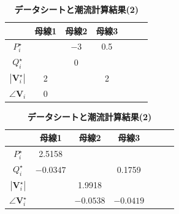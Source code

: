 \documentclass[tombow,dvipdfmx]{corona-a5-1.1}
\begin{document}
\begin{table}[h]
\medskip
\caption{\textbf{データシートと潮流計算結果(2)}} \label{table:pflow2}
 \centering
  {
  \begin{minipage}{0.49\linewidth}
    \centering
  \begin{tabular}{|c|c|c|c|c|c|c|}
   \hline
 & 母線1 & 母線2 & 母線3 \\
   \hline 
   $P_i^{\star}$ &  & $-3$ & 0.5 \\
   \hline    
   $Q_i^{\star}$ &  & 0 & \\
   \hline
   $|\bm{V}_i^{\star}|$ & 2 & & 2 \\
   \hline
   $\angle \bm{V}_i$ & 0 & &  \\
   \hline
  \end{tabular}
  \end{minipage}
  \begin{minipage}{0.49\linewidth}
    \centering
  \begin{tabular}{|c|c|c|c|c|c|c|}
   \hline
 &  母線1 & 母線2 & 母線3 \\
   \hline 
   $P_i^{\star}$ & 2.5158 & &  \\
   \hline
   $Q_i^{\star}$ & $-0.0347$ & & 0.1759 \\
   \hline
   $|\bm{V}_i^{\star}|$ & & 1.9918 & \\
   \hline
   $\angle \bm{V}_i^{\star}$ & & $-0.0538$ & $-0.0419$ \\
   \hline
  \end{tabular}
  \end{minipage}
  }
\end{table}
\end{document}
